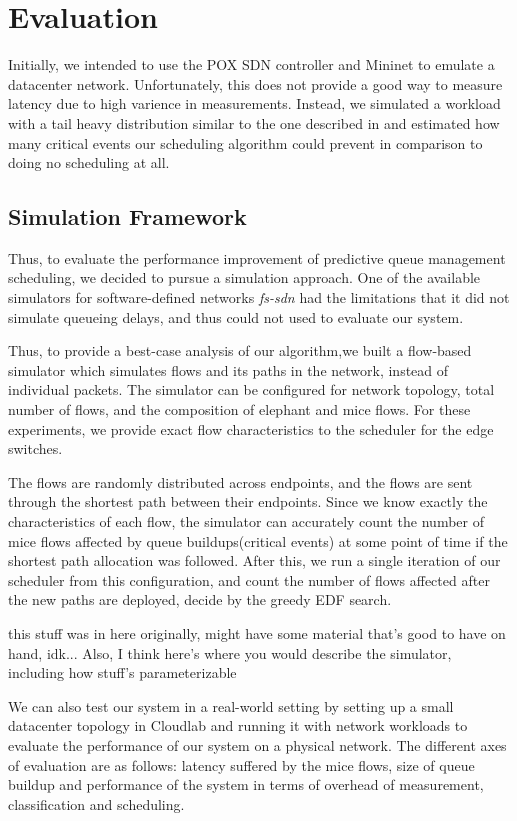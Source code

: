 \section{Evaluation}
Initially, we intended to use the POX SDN controller and Mininet to emulate a
datacenter network. Unfortunately, this does not provide a good way to measure
latency due to high varience in measurements. Instead, we simulated a workload
with a tail heavy distribution similar to the one described in
\cite{dctcp} and estimated how many critical events our scheduling algorithm
could prevent in comparison to doing no scheduling at all.

\subsection{Simulation Framework}
Thus, to evaluate the performance improvement of predictive
queue management scheduling, we decided to pursue a simulation
approach. One of the available simulators for software-defined networks
\emph{fs-sdn} \cite{fssdn} had the limitations that it did not simulate
queueing delays, and thus could not used to evaluate our system. 

Thus, to provide a best-case analysis of our algorithm,we built a 
flow-based simulator which simulates flows and its paths in the network,
instead of individual packets. The simulator can be configured for network topology,
total number of flows, and the composition of elephant and mice flows. For these
experiments, we provide exact  flow characteristics to the scheduler for the edge
switches. 

The flows are randomly distributed across endpoints, and the flows
are sent through the shortest path between their endpoints. Since we know
exactly the characteristics of each flow, the simulator can accurately count the
number of mice flows affected by queue buildups(critical events) at some point of time
if the shortest path allocation was followed. After this, we run a single iteration
of our scheduler from this configuration, and count the number of flows 
affected after the new paths are deployed, decide by the greedy EDF search. 


\iffalse this stuff was in here originally, might have some material that's
good to have on hand, idk... Also, I think here's where you would describe the
simulator, including how stuff's parameterizable

We can also test our system in a real-world setting by setting up a small datacenter topology in Cloudlab and running it with network workloads to evaluate the performance of our system on a physical network.  The different axes of evaluation are as follows: latency suffered by the mice flows, size of queue buildup and performance of the system in terms of overhead of measurement, classification and scheduling. 

